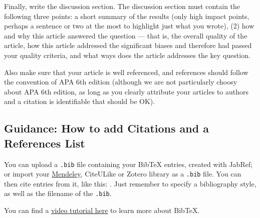 \documentclass[a4paper]{article}
\begin{document}
Finally, write the discussion section. The discussion section must contain the following three points: a short summary of the results (only high impact points, perhaps a sentence or two at the most to highlight just what you wrote), (2) how and why this article answered the question — that is, the overall quality of the article, how this article addressed the significant biases and therefore had passed your quality criteria, and what ways does the article addresses the key question. 

Also make sure that your article is well referenced, and references should follow the convention of APA 6th edition (although we are not particularly choosy about APA 6th edition, as long as you clearly attribute your articles to authors and a citation is identifiable that should be OK). 

\subsection*{Guidance: How to add Citations and a References List}

You can upload a \verb|.bib| file containing your BibTeX entries, created with JabRef; or import your \href{https://www.overleaf.com/blog/184}{Mendeley}, CiteULike or Zotero library as a \verb|.bib| file. You can then cite entries from it, like this: \cite{greenwade93}. Just remember to specify a bibliography style, as well as the filename of the \verb|.bib|.

You can find a \href{https://www.overleaf.com/help/97-how-to-include-a-bibliography-using-bibtex}{video tutorial here} to learn more about BibTeX.





\end{document}
